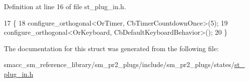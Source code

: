 Definition at line 16 of file st\+\_\+plug\+\_\+in.\+h.


\begin{DoxyCode}
17     \{
18         configure\_orthogonal<OrTimer,  CbTimerCountdownOnce>(5);    
19         configure\_orthogonal<OrKeyboard, CbDefaultKeyboardBehavior>();
20     \}
\end{DoxyCode}


The documentation for this struct was generated from the following file\+:\begin{DoxyCompactItemize}
\item 
smacc\+\_\+sm\+\_\+reference\+\_\+library/sm\+\_\+pr2\+\_\+plugs/include/sm\+\_\+pr2\+\_\+plugs/states/\hyperlink{st__plug__in_8h}{st\+\_\+plug\+\_\+in.\+h}\end{DoxyCompactItemize}
